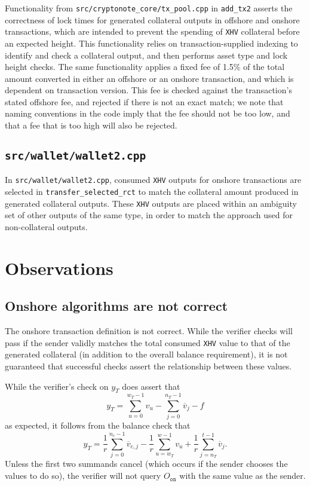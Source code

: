 \documentclass{article}
\newcommand{\oon}{O_{\texttt{on}}}
\begin{document}
Functionality from \texttt{src/cryptonote\_core/tx\_pool.cpp} in \texttt{add\_tx2} asserts the correctness of lock times for generated collateral outputs in offshore and onshore transactions, which are intended to prevent the spending of \texttt{XHV} collateral before an expected height.
This functionality relies on transaction-supplied indexing to identify and check a collateral output, and then performs asset type and lock height checks.
The same functionality applies a fixed fee of 1.5\% of the total amount converted in either an offshore or an onshore transaction, and which is dependent on transaction version.
This fee is checked against the transaction's stated offshore fee, and rejected if there is not an exact match; we note that naming conventions in the code imply that the fee should not be too low, and that a fee that is too high will also be rejected.


\subsection{\texttt{src/wallet/wallet2.cpp}}

In \texttt{src/wallet/wallet2.cpp}, consumed \texttt{XHV} outputs for onshore transactions are selected in \texttt{transfer\_selected\_rct} to match the collateral amount produced in generated collateral outputs.
These \texttt{XHV} outputs are placed within an ambiguity set of other outputs of the same type, in order to match the approach used for non-collateral outputs.


\section{Observations}


\subsection{Onshore algorithms are not correct}

The onshore transaction definition is not correct.
While the verifier checks will pass if the sender validly matches the total consumed \texttt{XHV} value to that of the generated collateral (in addition to the overall balance requirement), it is not guaranteed that successful checks assert the relationship between these values.

While the verifier's check on $y_T$ does assert that
$$y_T = \sum_{u=0}^{w_T-1} v_u - \sum_{j=0}^{n_T-1} \overline{v}_j - f$$
as expected, it follows from the balance check that
$$y_T = \frac{1}{r} \sum_{j=0}^{n_c-1} \overline{v}_{c,j} - \frac{1}{r} \sum_{u=w_T}^{w-1} v_u + \frac{1}{r} \sum_{j=n_T}^{t-1} \overline{v}_j.$$
Unless the first two summands cancel (which occurs if the sender chooses the values to do so), the verifier will not query $\oon$ with the same value as the sender.
\end{document}
